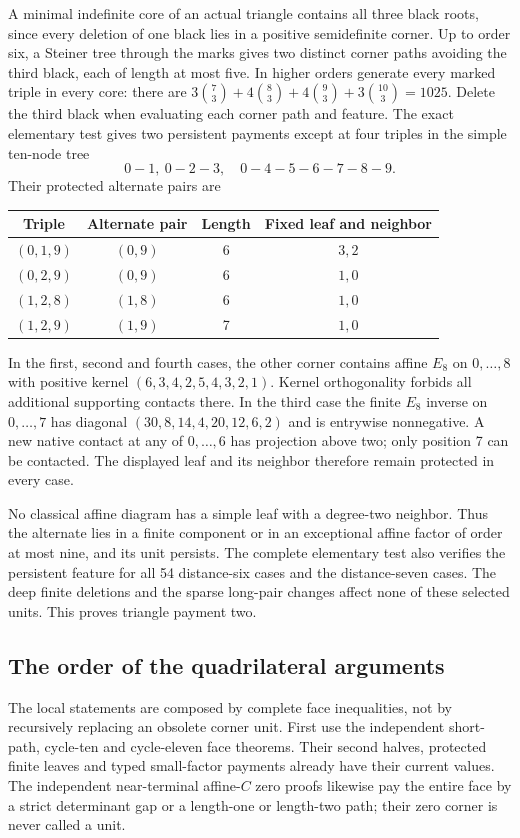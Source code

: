 \documentclass[11pt]{article}
\theoremstyle{remark}\newtheorem{remark}[theorem]{Remark}
\begin{document}
A minimal indefinite core of an actual triangle contains all three
black roots, since every deletion of one black lies in a positive
semidefinite corner. Up to order six, a Steiner tree through the
marks gives two distinct corner paths avoiding the third black,
each of length at most five. In higher orders generate every
marked triple in every core: there are
$3\binom73+4\binom83+4\binom93+3\binom{10}3=1025$.
Delete the third black when evaluating each corner path and feature.
The exact elementary test gives two persistent payments except
at four triples in the simple ten-node tree
\[
 0\! -\!1,\ 0\! -\!2\! -\!3,\quad
 0\! -\!4\! -\!5\! -\!6\! -\!7\! -\!8\! -\!9.
\]
Their protected alternate pairs are
\begin{center}
\begin{tabular}{c|c|c|c}
Triple&Alternate pair&Length&Fixed leaf and neighbor\\\hline
$(0,1,9)$&$(0,9)$&6&$3,2$\\
$(0,2,9)$&$(0,9)$&6&$1,0$\\
$(1,2,8)$&$(1,8)$&6&$1,0$\\
$(1,2,9)$&$(1,9)$&7&$1,0$
\end{tabular}
\end{center}
In the first, second and fourth cases, the other corner contains
affine $E_8$ on $0,\ldots,8$ with positive kernel
$(6,3,4,2,5,4,3,2,1)$. Kernel orthogonality forbids all additional
supporting contacts there. In the third case the finite $E_8$
inverse on $0,\ldots,7$ has diagonal
$(30,8,14,4,20,12,6,2)$ and is entrywise nonnegative. A new native
contact at any of $0,\ldots,6$ has projection above two; only
position 7 can be contacted. The displayed leaf and its neighbor
therefore remain protected in every case.

No classical affine diagram has a simple leaf with a degree-two
neighbor. Thus the alternate lies in a finite component or in an
exceptional affine factor of order at most nine, and its unit
persists. The complete elementary test also verifies the persistent
feature for all 54 distance-six cases and the distance-seven cases.
The deep finite deletions and the sparse long-pair changes affect
none of these selected units. This proves triangle payment two.

\subsection{The order of the quadrilateral arguments}

The local statements are composed by complete face inequalities,
not by recursively replacing an obsolete corner unit.
First use the independent short-path, cycle-ten and cycle-eleven
face theorems. Their second halves, protected finite leaves and
typed small-factor payments already have their current values.
The independent near-terminal affine-$C$ zero proofs likewise
pay the entire face by a strict determinant gap or a length-one
or length-two path; their zero corner is never called a unit.
\end{document}
